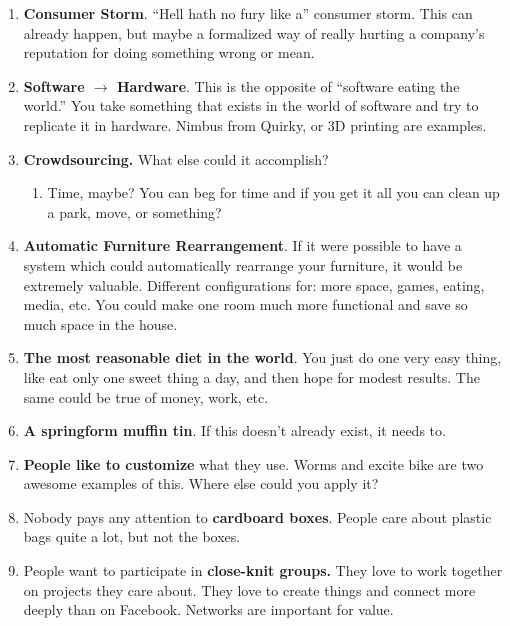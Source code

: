\documentclass[paper=a4, fontsize=11pt]{scrartcl} %
\numberwithin{equation}{section} %
\numberwithin{figure}{section} %
\numberwithin{table}{section} %
\begin{document}
\begin{enumerate}
\item \textbf{Consumer Storm}.  ``Hell hath no fury like a'' consumer storm.  This can already happen, but maybe a formalized way of really hurting a company's reputation for doing something wrong or mean.  

\item \textbf{Software $\rightarrow$ Hardware}.  This is the opposite of ``software eating the world.''  You take something that exists in the world of software and try to replicate it in hardware.  Nimbus from Quirky, or 3D printing are examples.  

\item \textbf{Crowdsourcing.}  What else could it accomplish?
	\begin{enumerate}
	\item Time, maybe?  You can beg for time and if you get it all you can clean up a park, move, or something?
	\end{enumerate}

\item \textbf{Automatic Furniture Rearrangement}.  If it were possible to have a system which could automatically rearrange your furniture, it would be extremely valuable.  Different configurations for: more space, games, eating, media, etc.  You could make one room much more functional and save so much space in the house.  

\item \textbf{The most reasonable diet in the world}.  You just do one very easy thing, like eat only one sweet thing a day, and then hope for modest results.  The same could be true of money, work, etc. 

\item \textbf{A springform muffin tin}.  If this doesn't already exist, it needs to.  

\item \textbf{People like to customize} what they use.  Worms and excite bike are two awesome examples of this.  Where else could you apply it?

\item Nobody pays any attention to \textbf{cardboard boxes}.  People care about plastic bags quite a lot, but not the boxes. 

\item People want to participate in \textbf{close-knit groups.}  They love to work together on projects they care about.  They love to create things and connect more deeply than on Facebook.  Networks are important for value.  


\end{enumerate}
\end{document}
